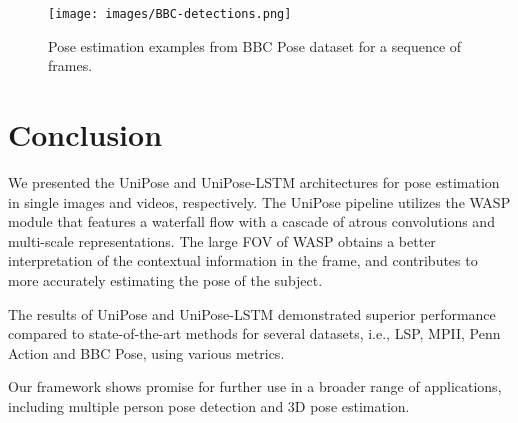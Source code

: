 \documentclass[10pt,twocolumn,letterpaper]{article}
\begin{document}
\begin{figure}[htbp]
\begin{center}
\texttt{[image: images/BBC-detections.png]}
\end{center}
  \caption{Pose estimation examples from BBC Pose dataset for a sequence of frames.}
\label{fig:BBC_detection}
\end{figure}









\section{Conclusion}
We presented the UniPose and UniPose-LSTM architectures for pose estimation in single images and videos, respectively. 
The UniPose pipeline utilizes the WASP module that features a waterfall flow with a cascade of atrous convolutions and multi-scale representations. 
The large FOV of WASP obtains a better interpretation of the contextual information in the frame, and contributes to more accurately estimating the pose of the subject.


The results of UniPose and UniPose-LSTM demonstrated superior performance compared to state-of-the-art methods for several datasets, i.e., LSP, MPII, Penn Action and BBC Pose, using various metrics. 

Our framework shows promise for further use in a broader range of applications, including multiple person pose detection and 3D pose estimation.

{\small


}
\end{document}
